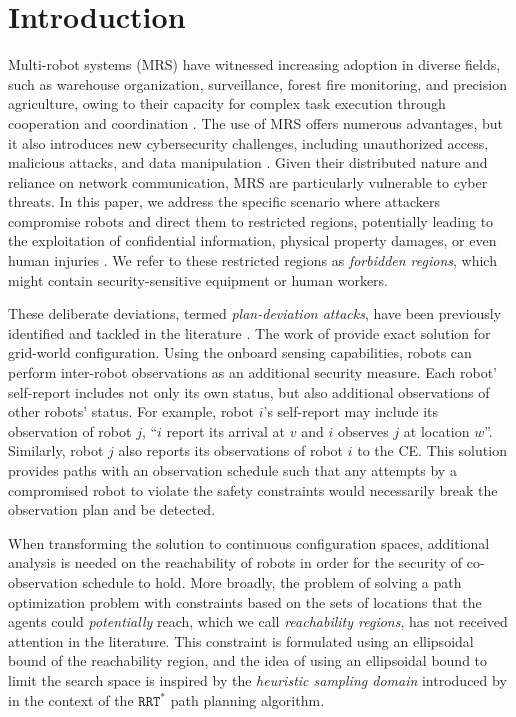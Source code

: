 \documentclass[journal]{IEEEtran}  %
\begin{document}
\section{Introduction}\label{sec:introduction}
Multi-robot systems (MRS) have witnessed increasing adoption in diverse fields, such as warehouse organization, surveillance, forest fire monitoring, and precision agriculture, owing to their capacity for complex task execution through cooperation and coordination \cite{pajares2015overview, julian2012distributed}. The use of MRS offers numerous advantages, but it also introduces new cybersecurity challenges, including unauthorized access, malicious attacks, and data manipulation \cite{brunner2010infiltrating}. Given their distributed nature and reliance on network communication, MRS are particularly vulnerable to cyber threats. In this paper, we address the specific scenario where attackers compromise robots and direct them to restricted regions, potentially leading to the exploitation of confidential information, physical property damages, or even human injuries \cite{forrest_2017}. We refer to these restricted regions as \emph{forbidden regions}, which might contain security-sensitive equipment or human workers.

These deliberate deviations, termed \emph{plan-deviation attacks}, have been previously identified and tackled in the literature \cite{wardega2019resilience} . The work of \cite{wardega2019resilience} provide exact solution for grid-world configuration. Using the onboard sensing capabilities, robots can perform inter-robot observations as an additional security measure. Each robot' self-report includes not only its own status, but also additional observations of other robots' status. For example, robot $i$'s self-report may include its observation of robot $j$, ``$i$ report its arrival at $v$ and $i$ observes $j$ at location $w$''. Similarly, robot $j$ also reports its observations of robot $i$ to the CE. This solution provides paths with an observation schedule such that any attempts by a compromised robot to violate the safety constraints would necessarily break the observation plan and be detected.

When transforming the solution to continuous configuration spaces, additional analysis is needed on the reachability of robots in order for the security of co-observation schedule to hold. More broadly, the problem of solving a path optimization problem with constraints based on the sets of locations that the agents could \emph{potentially} reach, which we call \emph{reachability regions}, has not received attention in the literature.  This constraint is formulated using an ellipsoidal bound of the reachability region, and the idea of using an ellipsoidal bound to limit the search space is inspired by the \emph{heuristic sampling domain} introduced by \cite{gammell2014informed} in the context of the $\mathtt{RRT^*}$ path planning algorithm.
\end{document}
